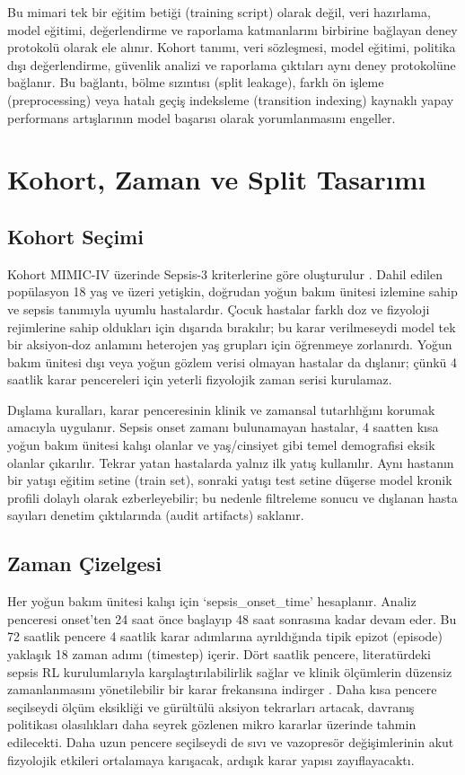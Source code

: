 \documentclass[conference]{IEEEtran}
\begin{document}
Bu mimari tek bir eğitim betiği (training script) olarak değil, veri hazırlama, model eğitimi, değerlendirme ve raporlama katmanlarını birbirine bağlayan deney protokolü olarak ele alınır. Kohort tanımı, veri sözleşmesi, model eğitimi, politika dışı değerlendirme, güvenlik analizi ve raporlama çıktıları aynı deney protokolüne bağlanır. Bu bağlantı, bölme sızıntısı (split leakage), farklı ön işleme (preprocessing) veya hatalı geçiş indeksleme (transition indexing) kaynaklı yapay performans artışlarının model başarısı olarak yorumlanmasını engeller.

\section{Kohort, Zaman ve Split Tasarımı}
\subsection{Kohort Seçimi}
Kohort MIMIC-IV üzerinde Sepsis-3 kriterlerine göre oluşturulur \cite{singer2016sepsis3,mimiciv}. Dahil edilen popülasyon 18 yaş ve üzeri yetişkin, doğrudan yoğun bakım ünitesi izlemine sahip ve sepsis tanımıyla uyumlu hastalardır. Çocuk hastalar farklı doz ve fizyoloji rejimlerine sahip oldukları için dışarıda bırakılır; bu karar verilmeseydi model tek bir aksiyon-doz anlamını heterojen yaş grupları için öğrenmeye zorlanırdı. Yoğun bakım ünitesi dışı veya yoğun gözlem verisi olmayan hastalar da dışlanır; çünkü 4 saatlik karar pencereleri için yeterli fizyolojik zaman serisi kurulamaz.

Dışlama kuralları, karar penceresinin klinik ve zamansal tutarlılığını korumak amacıyla uygulanır. Sepsis onset zamanı bulunamayan hastalar, 4 saatten kısa yoğun bakım ünitesi kalışı olanlar ve yaş/cinsiyet gibi temel demografisi eksik olanlar çıkarılır. Tekrar yatan hastalarda yalnız ilk yatış kullanılır. Aynı hastanın bir yatışı eğitim setine (train set), sonraki yatışı test setine düşerse model kronik profili dolaylı olarak ezberleyebilir; bu nedenle filtreleme sonucu ve dışlanan hasta sayıları denetim çıktılarında (audit artifacts) saklanır.

\subsection{Zaman Çizelgesi}
Her yoğun bakım ünitesi kalışı için `sepsis\_onset\_time' hesaplanır. Analiz penceresi onset'ten 24 saat önce başlayıp 48 saat sonrasına kadar devam eder. Bu 72 saatlik pencere 4 saatlik karar adımlarına ayrıldığında tipik epizot (episode) yaklaşık 18 zaman adımı (timestep) içerir. Dört saatlik pencere, literatürdeki sepsis RL kurulumlarıyla karşılaştırılabilirlik sağlar ve klinik ölçümlerin düzensiz zamanlanmasını yönetilebilir bir karar frekansına indirger \cite{komorowski2018ai,raghu2017sepsis}. Daha kısa pencere seçilseydi ölçüm eksikliği ve gürültülü aksiyon tekrarları artacak, davranış politikası olasılıkları daha seyrek gözlenen mikro kararlar üzerinde tahmin edilecekti. Daha uzun pencere seçilseydi de sıvı ve vazopresör değişimlerinin akut fizyolojik etkileri ortalamaya karışacak, ardışık karar yapısı zayıflayacaktı.
\end{document}
